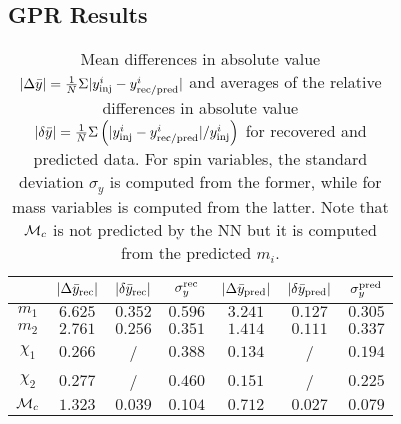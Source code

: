 \subsection{GPR Results}


\begin{table}
  \caption{\label{tab:NN_errors}  Mean differences in absolute value 
    $|\Delta \bar{y}|=  \frac{1}{N} \Sigma |y^i_{\rm inj} - y^i_{\rm rec/pred}|$
    and averages of the relative differences in absolute value 
    $|\delta \bar{y}| = \frac{1}{N} \Sigma \left( |y^i_{\rm inj} - 
    y^i_{\rm rec/pred}|/y^i_{\rm inj} \right) $ for recovered and predicted data.
    For spin variables, the standard deviation $\sigma_y$ is computed from the 
    former, while for mass variables is computed from the latter. Note that 
    ${\cal{M}}_c$ is not predicted by the NN but it is computed from the 
    predicted $m_i$.}
  \begin{center}
  \begin{tabular}{c|ccc|ccc}
  \hline\hline
  & $|\Delta \bar{y}_{\rm rec}|$  & $|\delta \bar{y}_{\rm rec}|$  & $\sigma_y^{\rm rec}$ &
     $|\Delta \bar{y}_{\rm pred}|$ & $|\delta \bar{y}_{\rm pred}|$ & $\sigma_y^{\rm pred}$ \\
  \hline\hline
$m_1$          & $6.625$ & $0.352$ & $0.596$ & $3.241$ & $0.127$ & $0.305$ \\
$m_2$          & $2.761$ & $0.256$ & $0.351$ & $1.414$ & $0.111$ & $0.337$ \\
$\chi_1$       & $0.266$ &  /  & $0.388$ & $0.134$ &  /  & $0.194$ \\
$\chi_2$       & $0.277$ &  /  & $0.460$ & $0.151$ &  /  & $0.225$ \\
\hline
${\cal{M}}_c$  & $1.323$ & $0.039$ & $0.104$ & $0.712$ & $0.027$ & $0.079$ \\
  \hline\hline
  \end{tabular}
  \end{center}
\end{table}

